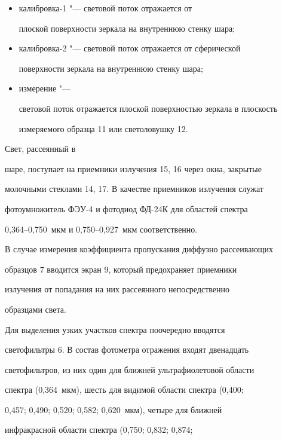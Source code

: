 \begin{itemize}

\item[1)] ка\-либ\-ров\-ка-1 "--- световой поток отражается от

плоской поверхности зеркала на внутреннюю стенку шара; 

\item[2)]

калибровка-2 "--- световой поток отражается от сферической

поверхности зеркала на внутреннюю стенку шара; 

\item[3)] измерение "---

световой поток отражается плоской поверхностью зеркала в плоскость

измеряемого образца 11 или светоловушку 12.

\end{itemize}



 Свет, рассеянный в

шаре, поступает на приемники излучения 15, 16 через окна, закрытые

молочными стеклами 14, 17. В качестве приемников излучения служат

фотоумножитель ФЭУ-4 и фотодиод ФД-24К для областей спектра

0,364--0,750~мкм и 0,750--0,927~мкм соответственно.



В случае измерения коэффициента пропускания диффузно рассеивающих

образцов 7 вводится экран 9, который предохраняет приемники

излучения от попадания на них рассеянного непосредственно

образцами света.



Для выделения узких участков спектра поочередно вводятся

светофильтры 6. В состав фотометра отражения входят двенадцать

светофильтров, из них один для ближней ультрафиолетовой области

спектра (0,364~мкм), шесть для видимой области спектра (0,400;

0,457; 0,490; 0,520; 0,582; 0,620~мкм), четыре для ближней

инфракрасной области спектра (0,750; 0,832; 0,874;\linebreak

